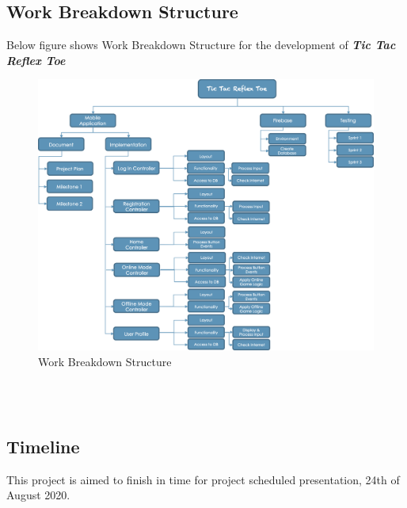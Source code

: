 \documentclass{article}
\begin{document}
    \subsection{Work Breakdown Structure}
    Below figure shows Work Breakdown Structure for the development of \textbf{\emph{Tic Tac Reflex Toe}}
            \begin{figure}[h]
            \centering
            \includegraphics[width=5.5in]{images/Work Breakdown Structure.png}
            \caption{Work Breakdown Structure}
        \end{figure}
        \\
        ~\\
    \subsection{Timeline}
        This project is aimed to finish in time for project scheduled presentation, 24th of August 2020.\\\\
\end{document}
